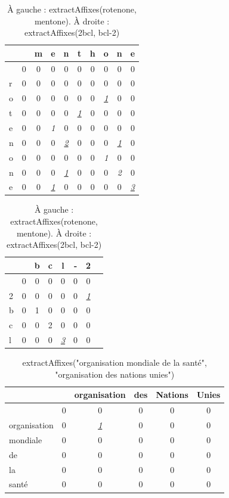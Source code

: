\documentclass[12pt,a4paper,times,twoside,openright]{report}
\begin{document}
\begin{table}[ht!]
\begin{minipage}{0.49\linewidth}
\centering
\begin{tabular}{l|ccccccccc}
  &    & m & e & n & t & h & o & n & e \\
\hline
  &  0 & 0 & 0 & 0 & 0 & 0 & 0 & 0 & 0 \\
r &  0 & 0 & 0 & 0 & 0 & 0 & 0 & 0 & 0 \\
o &  0 & 0 & 0 & 0 & 0 & 0 & \underline{\textit{1}} & 0 & 0 \\
t &  0 & 0 & 0 & 0 & \underline{\textit{1}} & 0 & 0 & 0 & 0 \\
e &  0 & 0 & \textit{1} & 0 & 0 & 0 & 0 & 0 & 0 \\
n &  0 & 0 & 0 & \underline{\textit{2}} & 0 & 0 & 0 & \underline{\textit{1}} & 0 \\
o &  0 & 0 & 0 & 0 & 0 & 0 & \textit{1} & 0 & 0 \\
n &  0 & 0 & 0 & \underline{\textit{1}} & 0 & 0 & 0 & \textit{2} & 0 \\
e &  0 & 0 & \underline{\textit{1}} & 0 & 0 & 0 & 0 & 0 & \underline{\textit{3}} \\
\end{tabular}
\end{minipage}
\begin{minipage}{0.49\linewidth}
\centering
\begin{tabular}{l|ccccccc}
  &    & b & c & l & - & 2 \\
\hline
  &  0 & 0 & 0 & 0 & 0 & 0 \\
2 &  0 & 0 & 0 & 0 & 0 & \underline{\textit{1}} \\
b &  0 & 1 & 0 & 0 & 0 & 0 \\
c &  0 & 0 & 2 & 0 & 0 & 0 \\
l &  0 & 0 & 0 & \underline{\textit{3}} & 0 & 0 \\
\end{tabular}
\end{minipage}
\caption{À gauche : extractAffixes(rotenone, mentone). À droite : extractAffixes(2bcl, bcl-2)}
\label{tab:extractAffixes}
\end{table}

\begin{table}[ht!]
\centering
\begin{tabular}{l|ccccc}
             &    & organisation & des & Nations & Unies\\
\hline
             &  0 & 0 & 0 & 0 & 0 \\
organisation &  0 & \underline{\textit{1}} & 0 & 0 & 0 \\
mondiale     &  0 & 0 & 0 & 0 & 0 \\
de           &  0 & 0 & 0 & 0 & 0 \\
la           &  0 & 0 & 0 & 0 & 0 \\
santé        &  0 & 0 & 0 & 0 & 0 \\
\end{tabular}
\caption{extractAffixes("organisation mondiale de la santé", "organisation des nations unies")}
\label{tab:keyword-extraction}
\end{table}
\end{document}

